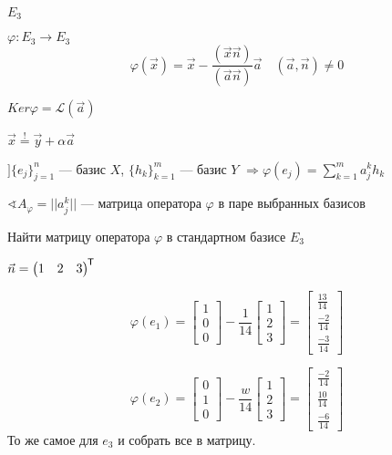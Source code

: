 \begin{example}
    $E_3$

    $\varphi : E_3\to E_3$
    $$\varphi(\vec x) = \vec x - \frac{(\vec x \vec n)}{(\vec a \vec n)}\vec a \quad (\vec a, \vec n)\not=0$$

    $Ker \varphi=\mathcal{L}(\vec a)$

    $\vec x \stackrel{!}{=} \vec y + \alpha \vec a$
\end{example}

$] \{e_j\}_{j=1}^n$ --- базис $X$, $\{h_k\}_{k=1}^m$ --- базис $Y$ $\Rightarrow \varphi(e_j)=\sum\limits_{k=1}^m a_j^kh_k$

$\sphericalangle A_\varphi=||a_j^k||$ --- матрица оператора $\varphi$ в паре выбранных базисов

\begin{example}
    Найти матрицу оператора $\varphi$ в стандартном базисе $E_3$

    $\vec n = \begin{pmatrix}
            1 & 2 & 3
        \end{pmatrix}^{\mkern-1.5mu\mathsf{T}} $

    $$\varphi(e_1)=\begin{bmatrix}
            1 \\ 0 \\ 0
        \end{bmatrix} - \frac{1}{14}\begin{bmatrix}
            1 \\
            2 \\
            3
        \end{bmatrix}=\begin{bmatrix}
            \frac{13}{14} \\
            \frac{-2}{14} \\
            \frac{-3}{14}
        \end{bmatrix}$$

    $$\varphi(e_2)=\begin{bmatrix}
            0 \\ 1 \\ 0
        \end{bmatrix} - \frac{w}{14}\begin{bmatrix}
            1 \\
            2 \\
            3
        \end{bmatrix}=\begin{bmatrix}
            \frac{-2}{14} \\
            \frac{10}{14} \\
            \frac{-6}{14}
        \end{bmatrix}$$
    То же самое для $e_3$ и собрать все в матрицу.
\end{example}

